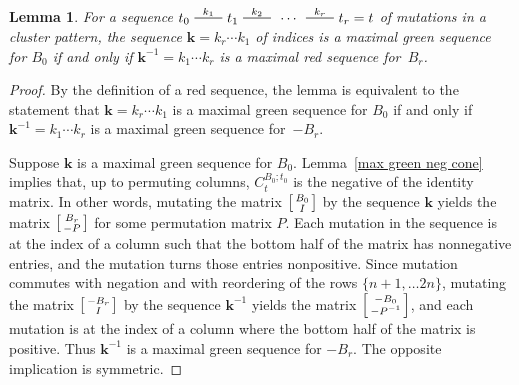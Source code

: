 \documentclass{amsart}
\newtheorem{lemma}[proposition]{Lemma}
\theoremstyle{definition}
\theoremstyle{remark}
\numberwithin{equation}{section}
\newcommand{\edge}{\,\,\rule[2.7pt]{20pt}{0.5pt}\,\,}
\newcommand{\I}{{\mathcal I}}
\newcommand{\0}{{\mathbf{0}}}
\newcommand{\kk}{{\boldsymbol{k}}}
\begin{document}
\begin{lemma}\label{max red green}
For a sequence $t_0\overset{k_1}{\edge}t_1\overset{k_2}{\edge}\,\cdots\,\overset{k_r}{\edge}t_r=t$ of mutations in a cluster pattern, the sequence $\kk=k_r\cdots k_1$ of indices is a maximal green sequence for $B_0$ if and only if $\kk^{-1}=k_1\cdots k_r$ is a maximal red sequence for~$B_r$.
\end{lemma}
\begin{proof}
By the definition of a red sequence, the lemma is equivalent to the statement that  $\kk=k_r\cdots k_1$ is a maximal green sequence for $B_0$ if and only if $\kk^{-1}=k_1\cdots k_r$ is a maximal green sequence for~$-B_r$.

Suppose $\kk$ is a maximal green sequence for $B_0$.
Lemma~\ref{max green neg cone} implies that, up to permuting columns, $C_t^{B_0;t_0}$ is the negative of the identity matrix.
In other words, mutating the matrix $\begin{bsmallmatrix}B_0\\I\end{bsmallmatrix}$ by the sequence $\kk$ yields the matrix $\begin{bsmallmatrix}B_r\\-P\end{bsmallmatrix}$ for some permutation matrix $P$.
Each mutation in the sequence is at the index of a column such that the bottom half of the matrix has nonnegative entries, and the mutation turns those entries nonpositive.
Since mutation commutes with negation and with reordering of the rows $\{n+1,\dots 2n\}$, mutating the matrix $\begin{bsmallmatrix}-B_r\\I\end{bsmallmatrix}$ by the sequence $\kk^{-1}$ yields the matrix $\begin{bsmallmatrix}-B_0\\-P^{-1}\end{bsmallmatrix}$, and each mutation is at the index of a column where the bottom half of the matrix is positive.
Thus $\kk^{-1}$ is a maximal green sequence for $-B_r$.
The opposite implication is symmetric.
\end{proof}
\end{document}

